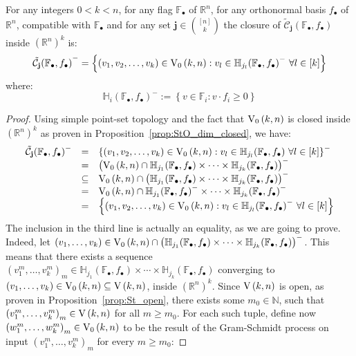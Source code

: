 \begin{lemma} For any integers $0<k<n$, for any flag $\mathbb{F}_{\bullet}$ of $\mathbb{R}^n$, for any orthonormal basis $f_{\bullet}$ of $\mathbb{R}^n$, compatible with $\mathbb{F}_{\bullet}$ and for any set $\mathbf{j}\in\binom{[n]}{k}$ the closure of $\tilde{\mathcal{C}}_{\mathbf{j}}{\left(\mathbb{F}_{\bullet},f_{\bullet}\right)}$ inside ${\left(\mathbb{R}^n\right)}^k$ is:
\[{\tilde{\mathcal{C}}_{\mathbf{j}}{\left(\mathbb{F}_{\bullet},f_{\bullet}\right)}}^-=\left\{(v_1,v_2,\ldots,v_k)\in\StO{k}{n}:v_l\in{\mathbb{H}_{j_l}(\mathbb{F}_{\bullet},f_{\bullet})}^-\ \forall l\in[k]\right\}\]
where:
\[{\mathbb{H}_i(\mathbb{F}_{\bullet},f_{\bullet})}^-:=\left\{v\in\mathbb{F}_i:v\cdot f_i\geq 0\right\}\]
\end{lemma}
\begin{proof} Using simple point-set topology and the fact that $\StO{k}{n}$ is closed inside ${\left(\mathbb{R}^n\right)}^k$ as proven in Proposition~\ref{prop:StO_dim_closed}, we have:
\[\begin{array}{rcl}\tilde{\mathcal{C}}_{\mathbf{j}}{\left(\mathbb{F}_{\bullet},f_{\bullet}\right)}^-
&=&{\left\{(v_1,v_2,\ldots,v_k)\in\StO{k}{n}:v_l\in\mathbb{H}_{j_l}(\mathbb{F}_{\bullet},f_{\bullet})\ \forall l\in[k]\right\}}^-\\
&=&{\big(\StO{k}{n}\cap\mathbb{H}_{j_1}(\mathbb{F}_{\bullet},f_{\bullet})\times\cdots\times\mathbb{H}_{j_k}(\mathbb{F}_{\bullet},f_{\bullet})\big)}^-\\
&\subseteq&\StO{k}{n}\cap{\big(\mathbb{H}_{j_1}(\mathbb{F}_{\bullet},f_{\bullet})\times\cdots\times\mathbb{H}_{j_k}(\mathbb{F}_{\bullet},f_{\bullet})\big)}^-\\
&=&\StO{k}{n}\cap\mathbb{H}_{j_1}{\left(\mathbb{F}_{\bullet},f_{\bullet}\right)}^-\times\cdots\times\mathbb{H}_{j_k}{\left(\mathbb{F}_{\bullet},f_{\bullet}\right)}^-\\
&=&\left\{(v_1,v_2,\ldots,v_k)\in\StO{k}{n}:v_l\in{\mathbb{H}_{j_l}(\mathbb{F}_{\bullet},f_{\bullet})}^-\ \forall l\in[k]\right\}\\
\end{array}\]
The inclusion in the third line is actually an equality, as we are going to prove. Indeed, let $(v_1,\ldots,v_k)\in\StO{k}{n}\cap{\big(\mathbb{H}_{j_1}(\mathbb{F}_{\bullet},f_{\bullet})\times\cdots\times\mathbb{H}_{j_k}(\mathbb{F}_{\bullet},f_{\bullet})\big)}^-$. This means that there exists a sequence ${(v_1^m,\ldots,v_k^m)}_m\in\mathbb{H}_{j_1}(\mathbb{F}_{\bullet},f_{\bullet})\times\cdots\times\mathbb{H}_{j_k}(\mathbb{F}_{\bullet},f_{\bullet})$ converging to $(v_1,\ldots,v_k)\in\StO{k}{n}\subseteq\St{k}{n}$, inside ${\left(\mathbb{R}^n\right)}^k$. Since $\St{k}{n}$ is open, as proven in Proposition~\ref{prop:St_open}, there exists some $m_0\in\mathbb{N}$, such that ${(v_1^m,\ldots,v_k^m)}_m\in\St{k}{n}$ for all $m\geq m_0$. For each such tuple, define now ${(w_1^m,\ldots,w_k^m)}_m\in\StO{k}{n}$ to be the result of the Gram-Schmidt process on input ${(v_1^m,\ldots,v_k^m)}_m$ for every $m\geq m_0$:

\end{proof}

